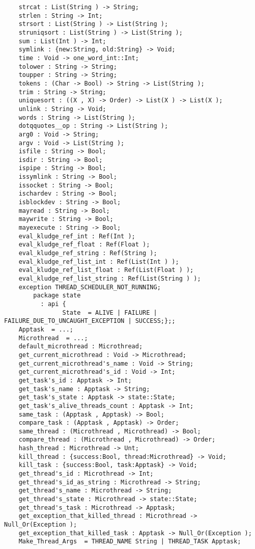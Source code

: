 \begin{verbatim}
    strcat : List(String ) -> String;
    strlen : String -> Int;
    strsort : List(String ) -> List(String );
    struniqsort : List(String ) -> List(String );
    sum : List(Int ) -> Int;
    symlink : {new:String, old:String} -> Void;
    time : Void -> one_word_int::Int;
    tolower : String -> String;
    toupper : String -> String;
    tokens : (Char -> Bool) -> String -> List(String );
    trim : String -> String;
    uniquesort : ((X , X) -> Order) -> List(X ) -> List(X );
    unlink : String -> Void;
    words : String -> List(String );
    dotqquotes__op : String -> List(String );
    arg0 : Void -> String;
    argv : Void -> List(String );
    isfile : String -> Bool;
    isdir : String -> Bool;
    ispipe : String -> Bool;
    issymlink : String -> Bool;
    issocket : String -> Bool;
    ischardev : String -> Bool;
    isblockdev : String -> Bool;
    mayread : String -> Bool;
    maywrite : String -> Bool;
    mayexecute : String -> Bool;
    eval_kludge_ref_int : Ref(Int );
    eval_kludge_ref_float : Ref(Float );
    eval_kludge_ref_string : Ref(String );
    eval_kludge_ref_list_int : Ref(List(Int ) );
    eval_kludge_ref_list_float : Ref(List(Float ) );
    eval_kludge_ref_list_string : Ref(List(String ) );
    exception THREAD_SCHEDULER_NOT_RUNNING;
        package state
          : api {
                State  = ALIVE | FAILURE | FAILURE_DUE_TO_UNCAUGHT_EXCEPTION | SUCCESS;};;
    Apptask  = ...;
    Microthread  = ...;
    default_microthread : Microthread;
    get_current_microthread : Void -> Microthread;
    get_current_microthread's_name : Void -> String;
    get_current_microthread's_id : Void -> Int;
    get_task's_id : Apptask -> Int;
    get_task's_name : Apptask -> String;
    get_task's_state : Apptask -> state::State;
    get_task's_alive_threads_count : Apptask -> Int;
    same_task : (Apptask , Apptask) -> Bool;
    compare_task : (Apptask , Apptask) -> Order;
    same_thread : (Microthread , Microthread) -> Bool;
    compare_thread : (Microthread , Microthread) -> Order;
    hash_thread : Microthread -> Unt;
    kill_thread : {success:Bool, thread:Microthread} -> Void;
    kill_task : {success:Bool, task:Apptask} -> Void;
    get_thread's_id : Microthread -> Int;
    get_thread's_id_as_string : Microthread -> String;
    get_thread's_name : Microthread -> String;
    get_thread's_state : Microthread -> state::State;
    get_thread's_task : Microthread -> Apptask;
    get_exception_that_killed_thread : Microthread -> Null_Or(Exception );
    get_exception_that_killed_task : Apptask -> Null_Or(Exception );
    Make_Thread_Args  = THREAD_NAME String | THREAD_TASK Apptask;

\end{verbatim}
